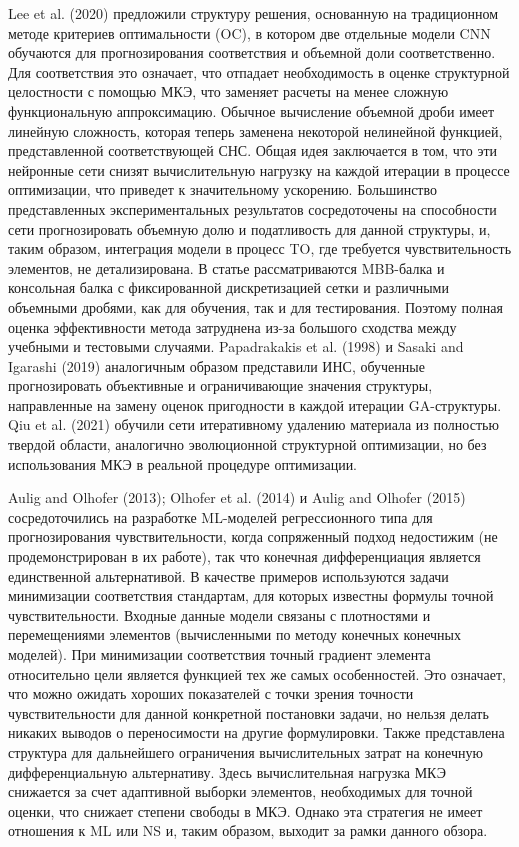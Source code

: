 Lee et al. (2020) предложили структуру решения, основанную на традиционном методе критериев оптимальности (OC), в котором две отдельные модели CNN обучаются для прогнозирования соответствия и объемной доли соответственно. Для соответствия это означает, что отпадает необходимость в оценке структурной целостности с помощью МКЭ, что заменяет расчеты на менее сложную функциональную аппроксимацию. Обычное вычисление объемной дроби имеет линейную сложность, которая теперь заменена некоторой нелинейной функцией, представленной соответствующей СНС. Общая идея заключается в том, что эти нейронные сети снизят вычислительную нагрузку на каждой итерации в процессе оптимизации, что приведет к значительному ускорению. Большинство представленных экспериментальных результатов сосредоточены на способности сети прогнозировать объемную долю и податливость для данной структуры, и, таким образом, интеграция модели в процесс TO, где требуется чувствительность элементов, не детализирована. В статье рассматриваются MBB-балка и консольная балка с фиксированной дискретизацией сетки и различными объемными дробями, как для обучения, так и для тестирования. Поэтому полная оценка эффективности метода затруднена из-за большого сходства между учебными и тестовыми случаями. Papadrakakis et al. (1998) и Sasaki and Igarashi (2019) аналогичным образом представили ИНС, обученные прогнозировать объективные и ограничивающие значения структуры, направленные на замену оценок пригодности в каждой итерации GA-структуры. Qiu et al. (2021) обучили сети итеративному удалению материала из полностью твердой области, аналогично эволюционной структурной оптимизации, но без использования МКЭ в реальной процедуре оптимизации.

Aulig and Olhofer (2013); Olhofer et al. (2014) и Aulig and Olhofer (2015) сосредоточились на разработке ML-моделей регрессионного типа для прогнозирования чувствительности, когда сопряженный подход недостижим (не продемонстрирован в их работе), так что конечная дифференциация является единственной альтернативой. В качестве примеров используются задачи минимизации соответствия стандартам, для которых известны формулы точной чувствительности. Входные данные модели связаны с плотностями и перемещениями элементов (вычисленными по методу конечных конечных моделей). При минимизации соответствия точный градиент элемента относительно цели является функцией тех же самых особенностей. Это означает, что можно ожидать хороших показателей с точки зрения точности чувствительности для данной конкретной постановки задачи, но нельзя делать никаких выводов о переносимости на другие формулировки. Также представлена структура для дальнейшего ограничения вычислительных затрат на конечную дифференциальную альтернативу. Здесь вычислительная нагрузка МКЭ снижается за счет адаптивной выборки элементов, необходимых для точной оценки, что снижает степени свободы в МКЭ. Однако эта стратегия не имеет отношения к ML или NS и, таким образом, выходит за рамки данного обзора.

